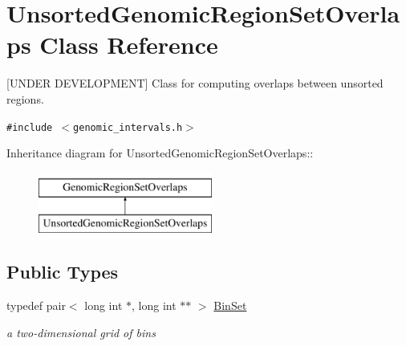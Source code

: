 \hypertarget{classUnsortedGenomicRegionSetOverlaps}{
\section{UnsortedGenomicRegionSetOverlaps Class Reference}
\label{classUnsortedGenomicRegionSetOverlaps}
}
\mbox{[}UNDER DEVELOPMENT\mbox{]} Class for computing overlaps between unsorted regions.  


{\tt \#include $<$genomic\_\-intervals.h$>$}

Inheritance diagram for UnsortedGenomicRegionSetOverlaps::\begin{figure}[H]
\begin{center}
\leavevmode
\includegraphics[height=2cm]{classUnsortedGenomicRegionSetOverlaps}
\end{center}
\end{figure}
\subsection*{Public Types}
\begin{CompactItemize}
\item 
\hypertarget{classUnsortedGenomicRegionSetOverlaps_0f0857dd93ad3c047d1f5056a57edc14}{
typedef pair$<$ long int $\ast$, long int $\ast$$\ast$ $>$ \hyperlink{classUnsortedGenomicRegionSetOverlaps_0f0857dd93ad3c047d1f5056a57edc14}{BinSet}}
\label{classUnsortedGenomicRegionSetOverlaps_0f0857dd93ad3c047d1f5056a57edc14}

\begin{CompactList}\small\item\em a two-dimensional grid of bins \item\end{CompactList}\end{CompactItemize}
